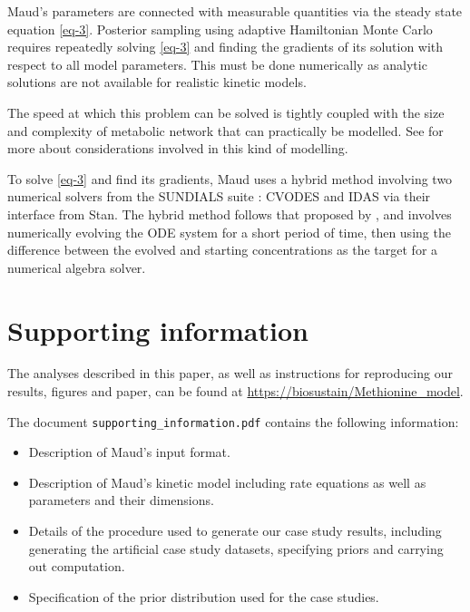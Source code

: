 \documentclass[journal=asbcd6,manuscript=article,layout=traditional]{achemso}
\providecommand{\tightlist}{%
  \setlength{\itemsep}{0pt}\setlength{\parskip}{0pt}}\usepackage{longtable,booktabs,array}
\begin{document}
Maud's parameters are connected with measurable quantities via the
steady state equation \eqref{eq-3}. Posterior sampling using adaptive
Hamiltonian Monte Carlo requires repeatedly solving \eqref{eq-3} and
finding the gradients of its solution with respect to all model
parameters. This must be done numerically as analytic solutions are not
available for realistic kinetic models.

The speed at which this problem can be solved is tightly coupled with
the size and complexity of metabolic network that can practically be
modelled. See \citet{timonenImportanceSamplingApproach2022a} for more
about considerations involved in this kind of modelling.

To solve \eqref{eq-3} and find its gradients, Maud uses a hybrid method
involving two numerical solvers from the SUNDIALS suite
\citep{serbanCVODESSensitivityEnabledODE2005}: CVODES and IDAS via their
interface from Stan. The hybrid method follows that proposed by
\citet{margossianComputingSteadyStates2018}, and involves numerically
evolving the ODE system for a short period of time, then using the
difference between the evolved and starting concentrations as the target
for a numerical algebra solver.

\section{Supporting information}\label{supporting-information}

The analyses described in this paper, as well as instructions for
reproducing our results, figures and paper, can be found at
\url{https://biosustain/Methionine_model}.

The document \texttt{supporting\_information.pdf} contains the following
information:

\begin{itemize}
\tightlist
\item
  Description of Maud's input format.
\item
  Description of Maud's kinetic model including rate equations as well
  as parameters and their dimensions.
\item
  Details of the procedure used to generate our case study results,
  including generating the artificial case study datasets, specifying
  priors and carrying out computation.
\item
  Specification of the prior distribution used for the case studies.
\end{itemize}
\end{document}
